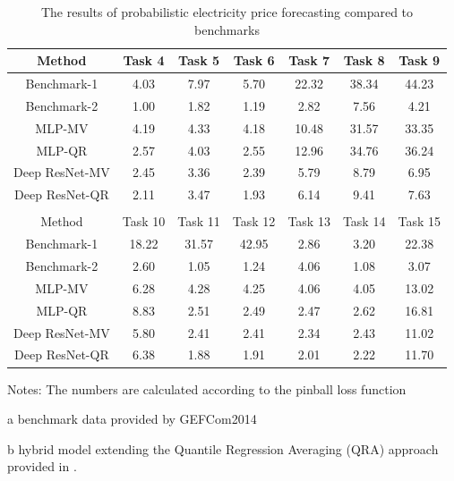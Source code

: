 \documentclass[review]{elsarticle}
\begin{document}
    \begin{table}[H]
      \caption{The results of probabilistic electricity price forecasting compared to benchmarks}
      \begin{adjustbox}{width=\textwidth}
      \begin{threeparttable}
        \begin{center}
          \begin{tabular}{ccccccc}
            \hline
            Method & Task 4 & Task 5& Task 6 & Task 7& Task 8 & Task 9\\
            \hline
            Benchmark-1 \tnote{a} & 4.03 & 7.97 & 5.70 & 22.32 & 38.34 & 44.23 \\
            Benchmark-2 \tnote{b} & 1.00 & 1.82 & 1.19 & 2.82 & 7.56 & 4.21 \\
            \hline
            MLP-MV & 4.19 & 4.33 & 4.18 & 10.48 & 31.57 & 33.35 \\
            MLP-QR & 2.57 & 4.03 & 2.55 & 12.96 & 34.76 & 36.24 \\
            Deep ResNet-MV& 2.45 & 3.36 & 2.39 & 5.79 & 8.79 & 6.95 \\
            Deep ResNet-QR& 2.11& 3.47& 1.93 & 6.14 & 9.41 & 7.63 \\
            \hline
            \\
            \hline
            Method & Task 10 & Task 11& Task 12 & Task 13 & Task 14 & Task 15\\
            \hline
            Benchmark-1 \tnote{a} &  18.22 & 31.57 & 42.95 & 2.86 & 3.20 & 22.38\\
            Benchmark-2 \tnote{b} &  2.60 & 1.05 & 1.24 & 4.06 & 1.08 & 3.07 \\
            \hline
            MLP-MV &  6.28 & 4.28 & 4.25 & 4.06 & 4.05 & 13.02\\
            MLP-QR &  8.83 & 2.51 & 2.49 & 2.47 & 2.62 & 16.81\\
            Deep ResNet-MV & 5.80 & 2.41 & 2.41 & 2.34 & 2.43 & 11.02 \\
            Deep ResNet-QR & 6.38 & 1.88 & 1.91 & 2.01 & 2.22 &11.70 \\
            \hline
          \end{tabular}
          \begin{tablenotes}
            Notes: The numbers are calculated according to the pinball loss function
            \item[a] benchmark data provided by GEFCom2014
            \item[b] hybrid model extending the Quantile Regression Averaging (QRA) approach provided in \cite{Maciejowska2016}.
          \end{tablenotes}
          \end{center}
      \end{threeparttable}
      \end{adjustbox}
      \label{table:result_pinball}
    \end{table}
\end{document}
